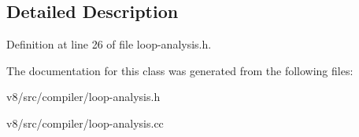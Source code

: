 \subsection{Detailed Description}


Definition at line 26 of file loop-\/analysis.\+h.



The documentation for this class was generated from the following files\+:\begin{DoxyCompactItemize}
\item 
v8/src/compiler/loop-\/analysis.\+h\item 
v8/src/compiler/loop-\/analysis.\+cc\end{DoxyCompactItemize}
